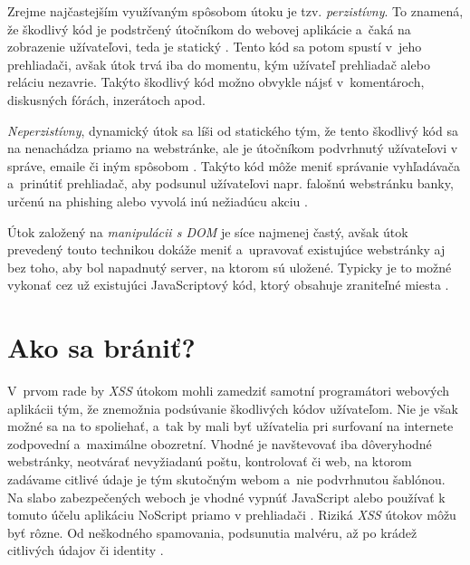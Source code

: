 \documentclass[a4paper,11pt, titlepage]{article}
\begin{document}
Zrejme najčastejším využívaným spôsobom útoku je tzv. \emph{perzistívny}. To znamená, že škodlivý kód je podstrčený útočníkom do webovej aplikácie a~čaká na zobrazenie užívateľovi, teda je statický \cite{Chorvat:Utoky_typu_Cross_Site_Scripting}. Tento kód sa potom spustí v~jeho prehliadači, avšak útok trvá iba do momentu, kým užívateľ prehliadač alebo reláciu nezavrie. Takýto škodlivý kód možno obvykle nájsť v~komentároch, diskusných fórách, inzerátoch apod.

\emph{Neperzistívny}, dynamický útok sa líši od statického tým, že tento škodlivý kód sa na nenachádza priamo na webstránke, ale je útočníkom podvrhnutý užívateľovi v správe, emaile či iným spôsobom \cite{Olejar:Analyza_utoku}. Takýto kód môže meniť správanie vyhľadávača a~prinútiť prehliadač, aby podsunul užívateľovi napr. falošnú webstránku banky, určenú na phishing alebo vyvolá inú nežiadúcu akciu \cite{Fogie:XSS_Attacks}.

Útok založený na \emph{manipulácii s DOM} je síce najmenej častý, avšak útok prevedený touto technikou dokáže meniť a~upravovať existujúce webstránky aj bez toho, aby bol napadnutý server, na ktorom sú uložené. Typicky je to možné vykonať cez už existujúci JavaScriptový kód, ktorý obsahuje zraniteľné miesta \cite{Kummel:XSS_v_praxi}. 

\section{Ako sa brániť?}
V~prvom rade by \emph{XSS} útokom mohli zamedziť samotní programátori webových aplikácii tým, že znemožnia podsúvanie škodlivých kódov užívateľom. Nie je však možné sa na to spoliehať, a~tak by mali byť užívatelia pri surfovaní na internete zodpovední a~maximálne obozretní. Vhodné je navštevovať iba dôveryhodné webstránky, neotvárať nevyžiadanú poštu, kontrolovať či web, na ktorom zadávame citlivé údaje je tým skutočným webom a~nie podvrhnutou šablónou. Na slabo zabezpečených weboch je vhodné vypnúť JavaScript alebo používať k tomuto účelu aplikáciu NoScript priamo v prehliadači \cite{IST:Automated_XSS_removal}. Riziká \emph{XSS} útokov môžu byť rôzne. Od neškodného spamovania, podsunutia malvéru, až po krádež citlivých údajov či identity \cite{CS:Malicious_XSS}.

\newpage



\def\refname{Použitá literatúra}


\end{document}
